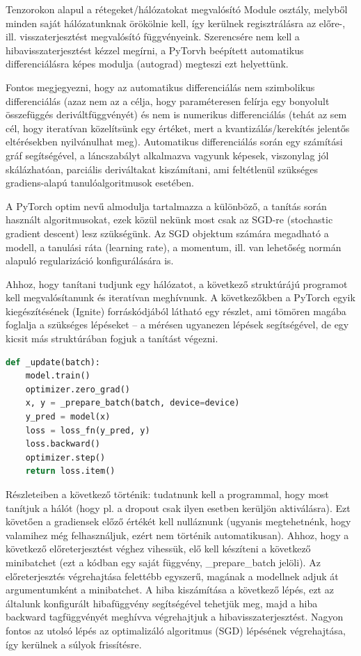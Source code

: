 \documentclass[12pt,a4paper,oneside]{report}             %
\begin{document}
Tenzorokon alapul a rétegeket/hálózatokat megvalósító Module osztály, melyből minden saját hálózatunknak örökölnie kell, így kerülnek regisztrálásra az előre-, ill. visszaterjesztést megvalósító függvényeink. Szerencsére nem kell a hibavisszaterjesztést kézzel megírni, a PyTorvh beépített automatikus differenciálásra képes modulja (autograd) megteszi ezt helyettünk.

Fontos megjegyezni, hogy az automatikus differenciálás nem szimbolikus differenciálás (azaz nem az a célja, hogy paraméteresen felírja egy bonyolult összefüggés deriváltfüggvényét) és nem is numerikus differenciálás (tehát az sem cél, hogy iteratívan közelítsünk egy értéket, mert a kvantizálás/kerekítés jelentős eltérésekben nyilvánulhat meg). Automatikus differenciálás során egy számítási gráf segítségével, a láncszabályt alkalmazva vagyunk képesek, viszonylag jól skálázhatóan, parciális deriváltakat kiszámítani, ami feltétlenül szükséges gradiens-alapú tanulóalgoritmusok esetében.

A PyTorch optim nevű almodulja tartalmazza a különböző, a tanítás során használt algoritmusokat, ezek közül nekünk most csak az SGD-re (stochastic gradient descent) lesz szükségünk. Az SGD objektum számára megadható a modell, a tanulási ráta (learning rate), a momentum, ill. van lehetőség normán alapuló regularizáció konfigurálására is.

Ahhoz, hogy tanítani tudjunk egy hálózatot, a következő struktúrájú programot kell megvalósítanunk és iteratívan meghívnunk. A következőkben a PyTorch egyik kiegészítésének (Ignite) forráskódjából látható egy részlet, ami tömören magába foglalja a szükséges lépéseket – a mérésen ugyanezen lépések segítségével, de egy kicsit más struktúrában fogjuk a tanítást végezni.

\begin{lstlisting}[language=Python]
def _update(batch):
	model.train()
	optimizer.zero_grad()
	x, y = _prepare_batch(batch, device=device)
	y_pred = model(x)
	loss = loss_fn(y_pred, y)
	loss.backward()
	optimizer.step()
	return loss.item()
\end{lstlisting}

Részleteiben a következő történik: tudatnunk kell a programmal, hogy most tanítjuk a hálót (hogy pl. a dropout csak ilyen esetben kerüljön aktiválásra). Ezt követően a gradiensek előző értékét kell nulláznunk (ugyanis megtehetnénk, hogy valamihez még felhasználjuk, ezért nem történik automatikusan). Ahhoz, hogy a következő előreterjesztést véghez vihessük, elő kell készíteni a következő minibatchet (ezt a kódban egy saját függvény, \_prepare\_batch jelöli). Az előreterjesztés végrehajtása felettébb egyszerű, magának a modellnek adjuk át argumentumként a minibatchet. A hiba kiszámítása a következő lépés, ezt az általunk konfigurált hibafüggvény segítségével tehetjük meg, majd a hiba backward tagfüggvényét meghívva végrehajtjuk a hibavisszaterjesztést. Nagyon fontos az utolsó lépés az optimalizáló algoritmus (SGD) lépésének végrehajtása, így kerülnek a súlyok frissítésre.
\end{document}
